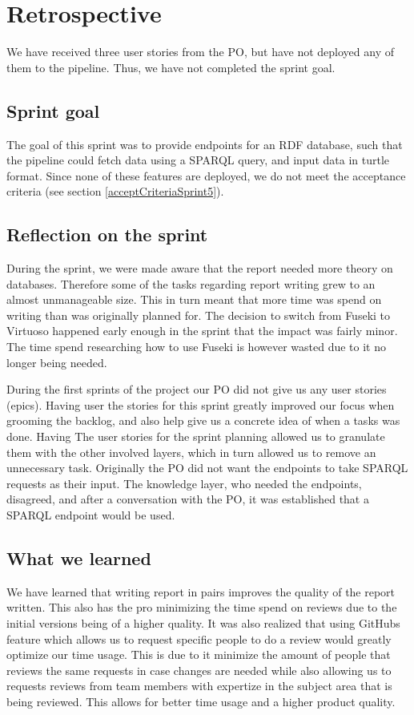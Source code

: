 \section{Retrospective}
We have received three user stories from the PO, but have not deployed any of them to the \knox pipeline. Thus, we have not completed the sprint goal.

\subsection{Sprint goal}
The goal of this sprint was to provide endpoints for an RDF database, such that the \knox pipeline could fetch data using a SPARQL query, and input data in turtle format.
Since none of these features are deployed, we do not meet the acceptance criteria (see section \ref{acceptCriteriaSprint5}).

\subsection{Reflection on the sprint}
During the sprint, we were made aware that the report needed more theory on databases. 
Therefore some of the tasks regarding report writing grew to an almost unmanageable size. This in turn meant that more time was spend on writing than was originally planned for.
The decision to switch from Fuseki to Virtuoso happened early enough in the sprint that the impact was fairly minor. The time spend researching how to use Fuseki is however wasted due to it no longer being needed.

During the first sprints of the project our PO did not give us any user stories (epics). Having user the stories for this sprint greatly improved our focus when grooming the backlog, and also help give us a concrete idea of when a tasks was done. 
Having The user stories for the sprint planning allowed us to granulate them with the other involved layers, which in turn allowed us to remove an unnecessary task. Originally the PO did not want the endpoints to take SPARQL requests as their input.
The knowledge layer, who needed the endpoints, disagreed, and after a conversation with the PO, it was established that a SPARQL endpoint would be used.

\subsection{What we learned}
We have learned that writing report in pairs improves the quality of the report written. This also has the pro minimizing the time spend on reviews due to the initial versions being of a higher quality.
It was also realized that using GitHubs feature which allows us to request specific people to do a review would greatly optimize our time usage. This is due to it minimize the amount of people that reviews the same requests in case changes are needed while also allowing us to requests reviews from team members with expertize in the subject area that is being reviewed. This allows for better time usage and a higher product quality. 

